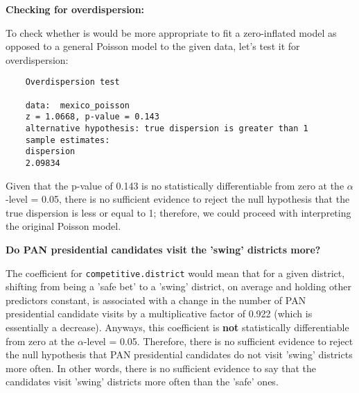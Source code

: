 \documentclass[12pt,letterpaper]{article}
\begin{document}
\begin{enumerate}
	\vspace{.25cm}
\textbf{Checking for overdispersion:}

To check whether is would be more appropriate to fit a zero-inflated model as opposed to a general Poisson model to the given data, let's test it for overdispersion: 
 

\begin{verbatim}
	Overdispersion test
	
	data:  mexico_poisson
	z = 1.0668, p-value = 0.143
	alternative hypothesis: true dispersion is greater than 1
	sample estimates:
	dispersion 
	2.09834 
\end{verbatim}

Given that the p-value of 0.143 is no statistically differentiable from zero at the $\alpha$-level = 0.05, there is no sufficient evidence to reject the null hypothesis that the true dispersion is less or equal to 1; therefore, we could proceed with interpreting the original Poisson model.

	\vspace{.25cm}
\textbf{Do PAN presidential candidates visit the 'swing' districts more?}

The coefficient for \texttt{competitive.district} would mean that for a given district, shifting from being a 'safe bet' to a 'swing' district, on average and holding other predictors constant, is associated with a change in the number of PAN presidential candidate visits by a multiplicative factor of 0.922 (which is essentially a decrease). Anyways, this coefficient
is \textbf{not} statistically differentiable from zero at the $\alpha$-level = 0.05. Therefore, there is no sufficient evidence to reject the null hypothesis that PAN presidential candidates do not visit 'swing' districts more often. In other words, there is no sufficient evidence to say that the candidates visit 'swing' districts more often than the 'safe' ones.



\end{enumerate}
\end{document}
